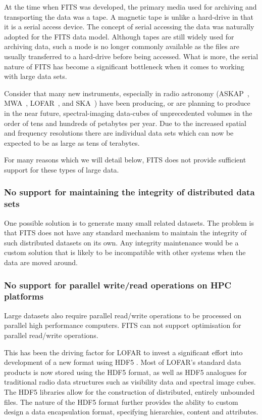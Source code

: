\documentclass[final,authoryear,5p,times,twocolumn]{elsarticle}
\begin{document}
{{At the time when FITS was developed, the primary media used for
archiving and transporting the data was a tape. A magnetic tape is
unlike a hard-drive in that it is a serial access device.  The concept
of serial accessing the data was naturally adopted for the FITS data
model.  Although tapes are still widely used for archiving data,
such a mode is no longer commonly available as the files are usually
transferred to a hard-drive before being accessed. What is more, the
serial nature of FITS has become a significant bottleneck when it comes
to working with large data sets.


Consider that many new instruments, especially in radio astronomy 
(ASKAP~\citep{2009IEEEP..97.1507D},
MWA~\citep{2013PASA...30....7T}, LOFAR~\citep{2013A&A...556A...2V}, and SKA~\citep{ska-exascale})
have been producing, or are planning to produce in the near future, 
spectral-imaging data-cubes of unprecedented volumes in the order of
tens and hundreds of petabytes per year. Due to the increased spatial and frequency
resolutions there are individual data sets which can now be expected to be as 
large as tens of terabytes.


For many reasons which we will detail below, FITS does not provide sufficient
support for these types of large data.

\subsubsection{No support for maintaining the integrity of distributed data sets}

One possible solution is to generate many small related datasets.
The problem is that FITS does not have any standard mechanism to maintain the
integrity of such distributed datasets on its own. Any integrity
maintenance would be a custom solution that is likely to be
incompatible with other systems when the data are moved around.

\subsubsection{No support for parallel write/read operations on HPC platforms}

Large datasets also require parallel read/write operations to be processed on 
parallel high performance computers. FITS can not support optimisation for 
parallel read/write operations. 

This has been the driving factor for LOFAR to 
invest a significant effort into development of a new format using
HDF5  \citep{2012ASPC..461..283A}. Most of LOFAR's standard data products 
is now stored using the HDF5 format, as well as HDF5 analogues for traditional radio data 
structures such as visibility data and spectral image cubes. The HDF5 libraries allow 
for the construction of distributed, entirely unbounded files. The nature of the HDF5 
format further provides the ability to custom design a data encapsulation format, 
specifying hierarchies, content and attributes.

}}
\end{document}
